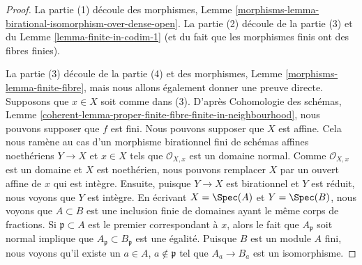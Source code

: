 \begin{proof}
La partie (1) découle des morphismes, Lemme
\ref{morphisms-lemma-birational-isomorphism-over-dense-open}. La
partie (2) découle de la partie (3) et du Lemme
\ref{lemma-finite-in-codim-1} (et du fait que les morphismes finis ont des fibres finies).

\medskip\noindent
La partie (3) découle de la partie (4) et des morphismes,
Lemme \ref{morphisms-lemma-finite-fibre}, mais nous allons
également donner une preuve directe. Supposons que $x \in
X$ soit comme dans (3). D'après Cohomologie des schémas,
Lemme
\ref{coherent-lemma-proper-finite-fibre-finite-in-neighbourhood},
nous pouvons supposer que $f$ est fini. Nous pouvons supposer
que $X$ est affine. Cela nous ramène au cas d'un morphisme
birationnel fini de schémas affines noethériens $Y \to X$ et $x
\in X$ tels que $\mathcal{O}_{X, x}$ est un domaine normal.
Comme $\mathcal{O}_{X, x}$ est un domaine et $X$ est
noethérien, nous pouvons remplacer $X$ par un ouvert affine de
$x$ qui est intègre. Ensuite, puisque $Y \to X$ est birationnel
et $Y$ est réduit, nous voyons que $Y$ est intègre. En écrivant
$X = \Spec(A)$ et $Y = \Spec(B)$, nous voyons que $A \subset B$
est une inclusion finie de domaines ayant le même corps de
fractions. Si $\mathfrak p \subset A$ est le premier correspondant
à $x$, alors le fait que $A_\mathfrak p$ soit normal implique que
$A_\mathfrak p \subset B_\mathfrak p$ est une égalité. Puisque $B$
est un module $A$ fini, nous voyons qu'il existe un $a \in A$, $a
\not \in \mathfrak p$ tel que $A_a \to B_a$ est un isomorphisme.


\end{proof}

